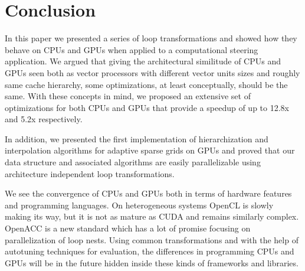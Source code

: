 \section{Conclusion}

In this paper we presented a series of loop transformations and showed
how they behave on CPUs and GPUs when applied to a computational steering
application. We argued that giving the architectural similitude of CPUs and GPUs
seen both as vector processors with different vector units sizes and roughly
same cache hierarchy, some optimizations, at least conceptually, should be the
same. With these concepts in mind, we proposed an extensive set of optimizations
for both CPUs and GPUs that provide a speedup of up to 12.8x and 5.2x
respectively.

In addition, we presented the first implementation of hierarchization and
interpolation algorithms for adaptive sparse grids on GPUs and proved that our
data structure and associated algorithms are easily parallelizable using
architecture independent loop transformations.

We see the convergence of CPUs and GPUs both in terms of hardware features and
programming languages. On heterogeneous systems OpenCL \cite{opencl} is slowly
making its way, but it is not as mature as CUDA and remains similarly complex.
OpenACC \cite{openacc} is a new standard which has a lot of promise focusing on
parallelization of loop nests. Using common transformations and with the help of
autotuning techniques for evaluation, the differences in programming CPUs and
GPUs will be in the future hidden inside these kinds of frameworks and
libraries.
